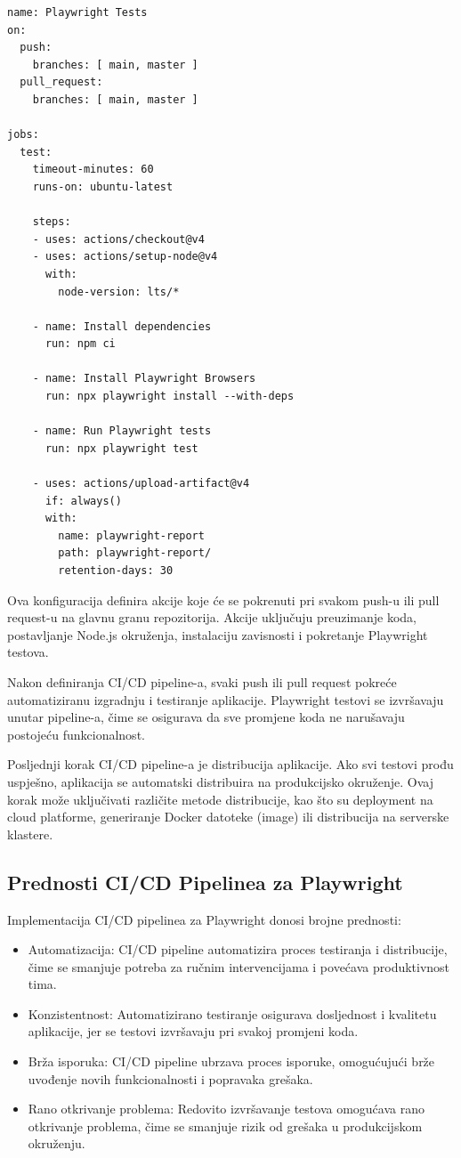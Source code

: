 \begin{verbatim}
name: Playwright Tests
on:
  push:
    branches: [ main, master ]
  pull_request:
    branches: [ main, master ]

jobs:
  test:
    timeout-minutes: 60
    runs-on: ubuntu-latest

    steps:
    - uses: actions/checkout@v4
    - uses: actions/setup-node@v4
      with:
        node-version: lts/*

    - name: Install dependencies
      run: npm ci

    - name: Install Playwright Browsers
      run: npx playwright install --with-deps

    - name: Run Playwright tests
      run: npx playwright test

    - uses: actions/upload-artifact@v4
      if: always()
      with:
        name: playwright-report
        path: playwright-report/
        retention-days: 30
\end{verbatim}
Ova konfiguracija definira akcije koje će se pokrenuti pri svakom push-u ili pull request-u na glavnu granu repozitorija. Akcije uključuju preuzimanje koda, postavljanje Node.js okruženja, instalaciju zavisnosti i pokretanje Playwright testova.

Nakon definiranja CI/CD pipeline-a, svaki push ili pull request pokreće automatiziranu izgradnju i testiranje aplikacije. 
Playwright testovi se izvršavaju unutar pipeline-a, čime se osigurava da sve promjene koda ne narušavaju postojeću funkcionalnost.

Posljednji korak CI/CD pipeline-a je distribucija aplikacije. 
Ako svi testovi prođu uspješno, aplikacija se automatski distribuira na produkcijsko okruženje. 
Ovaj korak može uključivati različite metode distribucije, kao što su deployment na cloud platforme, generiranje Docker datoteke (image) ili distribucija na serverske klastere.

\subsection*{Prednosti CI/CD Pipelinea za Playwright}
Implementacija CI/CD pipelinea za Playwright donosi brojne prednosti:
\begin{itemize}
    \item Automatizacija: CI/CD pipeline automatizira proces testiranja i distribucije, čime se smanjuje potreba za ručnim intervencijama i povećava produktivnost tima.
    \item Konzistentnost: Automatizirano testiranje osigurava dosljednost i kvalitetu aplikacije, jer se testovi izvršavaju pri svakoj promjeni koda.
    \item Brža isporuka: CI/CD pipeline ubrzava proces isporuke, omogućujući brže uvođenje novih funkcionalnosti i popravaka grešaka.
    \item Rano otkrivanje problema: Redovito izvršavanje testova omogućava rano otkrivanje problema, čime se smanjuje rizik od grešaka u produkcijskom okruženju.
\end{itemize}